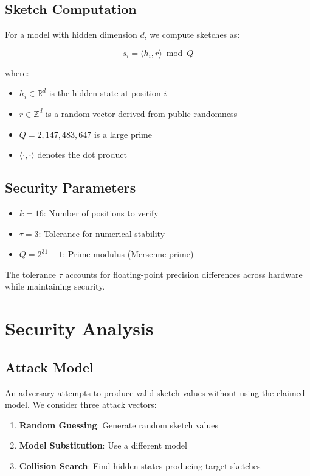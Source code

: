 \documentclass[11pt,a4paper]{article}
\begin{document}
\subsection{Sketch Computation}

For a model with hidden dimension $d$, we compute sketches as:

\begin{equation}
s_i = \langle h_i, r \rangle \bmod Q
\end{equation}

where:
\begin{itemize}
    \item $h_i \in \mathbb{R}^d$ is the hidden state at position $i$
    \item $r \in \mathbb{Z}^d$ is a random vector derived from public randomness
    \item $Q = 2,147,483,647$ is a large prime
    \item $\langle \cdot, \cdot \rangle$ denotes the dot product
\end{itemize}

\subsection{Security Parameters}

\begin{itemize}
    \item $k = 16$: Number of positions to verify
    \item $\tau = 3$: Tolerance for numerical stability
    \item $Q = 2^{31} - 1$: Prime modulus (Mersenne prime)
\end{itemize}

The tolerance $\tau$ accounts for floating-point precision differences across hardware while maintaining security.

\section{Security Analysis}

\subsection{Attack Model}

An adversary attempts to produce valid sketch values without using the claimed model. We consider three attack vectors:

\begin{enumerate}
    \item \textbf{Random Guessing}: Generate random sketch values
    \item \textbf{Model Substitution}: Use a different model
    \item \textbf{Collision Search}: Find hidden states producing target sketches
\end{enumerate}
\end{document}

